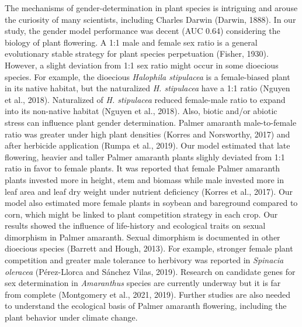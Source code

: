 \documentclass[utf8]{frontiersSCNS}
\begin{document}
The mechanisms of gender-determination in plant species is intriguing
and arouse the curiosity of many scientists, including Charles Darwin
(Darwin, 1888). In our study, the gender model performance was decent
(AUC 0.64) considering the biology of plant flowering. A 1:1 male and
female sex ratio is a general evolutionary stable strategy for plant
species perpetuation (Fisher, 1930). However, a slight deviation from
1:1 sex ratio might occur in some dioecious species. For example, the
dioecious \emph{Halophila stipulacea} is a female-biased plant in its
native habitat, but the naturalized \emph{H. stipulacea} have a 1:1
ratio (Nguyen et al., 2018). Naturalized of \emph{H. stipulacea} reduced
female-male ratio to expand into its non-native habitat (Nguyen et al.,
2018). Also, biotic and/or abiotic stress can influence plant gender
determination. Palmer amaranth male-to-female ratio was greater under
high plant densities (Korres and Norsworthy, 2017) and after herbicide
application (Rumpa et al., 2019). Our model estimated that late
flowering, heavier and taller Palmer amaranth plants slighly deviated
from 1:1 ratio in favor to female plants. It was reported that female
Palmer amaranth plants invested more in height, stem and biomass while
male invested more in leaf area and leaf dry weight under nutrient
deficiency (Korres et al., 2017). Our model also estimated more female
plants in soybean and bareground compared to corn, which might be linked
to plant competition strategy in each crop. Our results showed the
influence of life-history and ecological traits on sexual dimorphism in
Palmer amaranth. Sexual dimorphism is documented in other dioecious
species (Barrett and Hough, 2013). For example, stronger female plant
competition and greater male tolerance to herbivory was reported in
\emph{Spinacia oleracea} (Pérez-Llorca and Sánchez Vilas, 2019).
Research on candidate genes for sex determination in \emph{Amaranthus}
species are currently underway but it is far from complete (Montgomery
et al., 2021, 2019). Further studies are also needed to understand the
ecological basis of Palmer amaranth flowering, including the plant
behavior under climate change.
\end{document}
